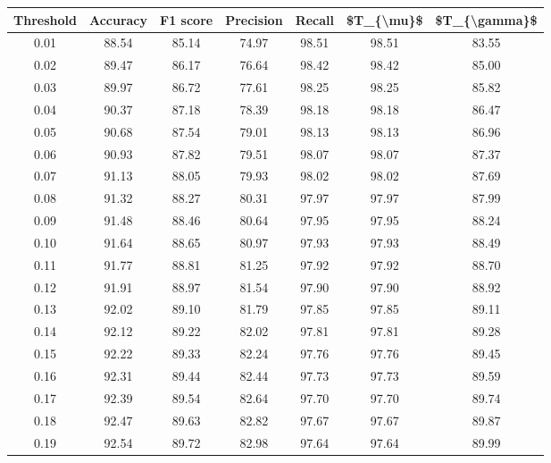 \begin{tabular}{|c|c|c|c|c|c|c|}
\hline
 Threshold &  Accuracy &  F1 score &  Precision &  Recall &  \$T\_\{\textbackslash mu\}\$ &  \$T\_\{\textbackslash gamma\}\$ \\
\hline
      0.01 &     88.54 &     85.14 &      74.97 &   98.51 &      98.51 &         83.55 \\
      0.02 &     89.47 &     86.17 &      76.64 &   98.42 &      98.42 &         85.00 \\
      0.03 &     89.97 &     86.72 &      77.61 &   98.25 &      98.25 &         85.82 \\
      0.04 &     90.37 &     87.18 &      78.39 &   98.18 &      98.18 &         86.47 \\
      0.05 &     90.68 &     87.54 &      79.01 &   98.13 &      98.13 &         86.96 \\
      0.06 &     90.93 &     87.82 &      79.51 &   98.07 &      98.07 &         87.37 \\
      0.07 &     91.13 &     88.05 &      79.93 &   98.02 &      98.02 &         87.69 \\
      0.08 &     91.32 &     88.27 &      80.31 &   97.97 &      97.97 &         87.99 \\
      0.09 &     91.48 &     88.46 &      80.64 &   97.95 &      97.95 &         88.24 \\
      0.10 &     91.64 &     88.65 &      80.97 &   97.93 &      97.93 &         88.49 \\
      0.11 &     91.77 &     88.81 &      81.25 &   97.92 &      97.92 &         88.70 \\
      0.12 &     91.91 &     88.97 &      81.54 &   97.90 &      97.90 &         88.92 \\
      0.13 &     92.02 &     89.10 &      81.79 &   97.85 &      97.85 &         89.11 \\
      0.14 &     92.12 &     89.22 &      82.02 &   97.81 &      97.81 &         89.28 \\
      0.15 &     92.22 &     89.33 &      82.24 &   97.76 &      97.76 &         89.45 \\
      0.16 &     92.31 &     89.44 &      82.44 &   97.73 &      97.73 &         89.59 \\
      0.17 &     92.39 &     89.54 &      82.64 &   97.70 &      97.70 &         89.74 \\
      0.18 &     92.47 &     89.63 &      82.82 &   97.67 &      97.67 &         89.87 \\
      0.19 &     92.54 &     89.72 &      82.98 &   97.64 &      97.64 &         89.99 \\

\end{tabular}
